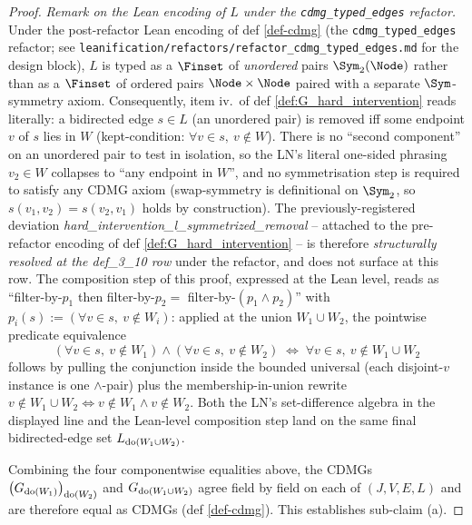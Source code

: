\begin{proof}
\smallskip\noindent\emph{Remark on the Lean encoding of $L$ under the \texttt{cdmg\_typed\_edges} refactor.} Under the post-refactor Lean encoding of def \ref{def-cdmg} (the \texttt{cdmg\_typed\_edges} refactor; see \texttt{leanification/refactors/refactor\_cdmg\_typed\_edges.md} for the design block), $L$ is typed as a $\Finset$ of \emph{unordered} pairs $\Sym_2(\Node)$ rather than as a $\Finset$ of ordered pairs $\Node \times \Node$ paired with a separate $\Sym$-symmetry axiom. Consequently, item iv.\ of def \ref{def:G_hard_intervention} reads literally: a bidirected edge $s \in L$ (an unordered pair) is removed iff some endpoint $v$ of $s$ lies in $W$ (kept-condition: $\forall v \in s,\ v \notin W$). There is no ``second component'' on an unordered pair to test in isolation, so the LN's literal one-sided phrasing $v_2 \in W$ collapses to ``any endpoint in $W$'', and no symmetrisation step is required to satisfy any CDMG axiom (swap-symmetry is definitional on $\Sym_2$, so $s(v_1, v_2) = s(v_2, v_1)$ holds by construction). The previously-registered deviation \emph{hard\_intervention\_l\_symmetrized\_removal} -- attached to the pre-refactor encoding of def \ref{def:G_hard_intervention} -- is therefore \emph{structurally resolved at the def\_3\_10 row} under the refactor, and does not surface at this row. The composition step of this proof, expressed at the Lean level, reads as ``filter-by-$p_1$ then filter-by-$p_2 = $ filter-by-$(p_1 \wedge p_2)$'' with $p_i(s) := (\forall v \in s,\ v \notin W_i)$: applied at the union $W_1 \cup W_2$, the pointwise predicate equivalence
\[
    (\forall v \in s,\ v \notin W_1) \wedge (\forall v \in s,\ v \notin W_2) \;\Longleftrightarrow\; \forall v \in s,\ v \notin W_1 \cup W_2
\]
follows by pulling the conjunction inside the bounded universal (each disjoint-$v$ instance is one $\wedge$-pair) plus the membership-in-union rewrite $v \notin W_1 \cup W_2 \Leftrightarrow v \notin W_1 \wedge v \notin W_2$. Both the LN's set-difference algebra in the displayed line and the Lean-level composition step land on the same final bidirected-edge set $L_{\operatorname{do}(W_1 \cup W_2)}$.

\smallskip
Combining the four componentwise equalities above, the CDMGs $\left ( G_{\operatorname{do}(W_1)} \right )_{\operatorname{do}(W_2)}$ and $G_{\operatorname{do}(W_1 \cup W_2)}$ agree field by field on each of $(J, V, E, L)$ and are therefore equal as CDMGs (def \ref{def-cdmg}). This establishes sub-claim (a).


\end{proof}

